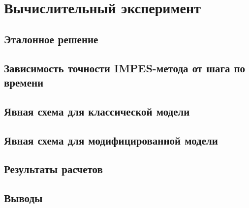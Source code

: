\section{Вычислительный эксперимент}

\subsection{Эталонное решение}

\subsection{Зависимость точности IMPES-метода от шага по времени}

\subsection{Явная схема для классической модели}

\subsection{Явная схема для модифицированной модели}

\subsection{Результаты расчетов}

\subsection{Выводы}